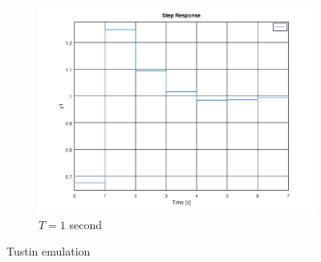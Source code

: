 \documentclass[a4paper, 12pt]{article}
\begin{document}
\begin{figure}[H]
  \begin{subfigure}{.6\textwidth}
    \includegraphics[width=\textwidth]{./img/2_5_tustin1.png}
    \caption{$T = 1$ second}
    \label{fig:tustin1}
  \end{subfigure}
  \caption{Tustin emulation}
\end{figure}
\end{document}
